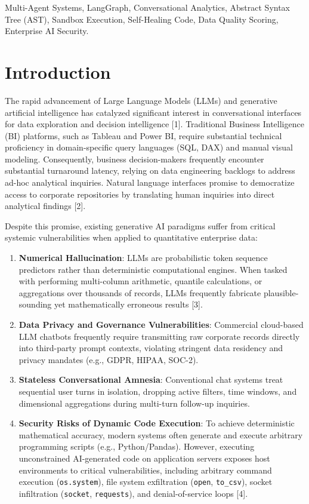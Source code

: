 \documentclass[conference]{IEEEtran}
\begin{document}
\begin{IEEEkeywords}
Multi-Agent Systems, LangGraph, Conversational Analytics, Abstract Syntax Tree (AST), Sandbox Execution, Self-Healing Code, Data Quality Scoring, Enterprise AI Security.
\end{IEEEkeywords}

\section{Introduction}
The rapid advancement of Large Language Models (LLMs) and generative artificial intelligence has catalyzed significant interest in conversational interfaces for data exploration and decision intelligence [1]. Traditional Business Intelligence (BI) platforms, such as Tableau and Power BI, require substantial technical proficiency in domain-specific query languages (SQL, DAX) and manual visual modeling. Consequently, business decision-makers frequently encounter substantial turnaround latency, relying on data engineering backlogs to address ad-hoc analytical inquiries. Natural language interfaces promise to democratize access to corporate repositories by translating human inquiries into direct analytical findings [2].

Despite this promise, existing generative AI paradigms suffer from critical systemic vulnerabilities when applied to quantitative enterprise data:
\begin{enumerate}
    \item \textbf{Numerical Hallucination}: LLMs are probabilistic token sequence predictors rather than deterministic computational engines. When tasked with performing multi-column arithmetic, quantile calculations, or aggregations over thousands of records, LLMs frequently fabricate plausible-sounding yet mathematically erroneous results [3].
    \item \textbf{Data Privacy and Governance Vulnerabilities}: Commercial cloud-based LLM chatbots frequently require transmitting raw corporate records directly into third-party prompt contexts, violating stringent data residency and privacy mandates (e.g., GDPR, HIPAA, SOC-2).
    \item \textbf{Stateless Conversational Amnesia}: Conventional chat systems treat sequential user turns in isolation, dropping active filters, time windows, and dimensional aggregations during multi-turn follow-up inquiries.
    \item \textbf{Security Risks of Dynamic Code Execution}: To achieve deterministic mathematical accuracy, modern systems often generate and execute arbitrary programming scripts (e.g., Python/Pandas). However, executing unconstrained AI-generated code on application servers exposes host environments to critical vulnerabilities, including arbitrary command execution (\texttt{os.system}), file system exfiltration (\texttt{open}, \texttt{to\_csv}), socket infiltration (\texttt{socket}, \texttt{requests}), and denial-of-service loops [4].
\end{enumerate}
\end{document}
